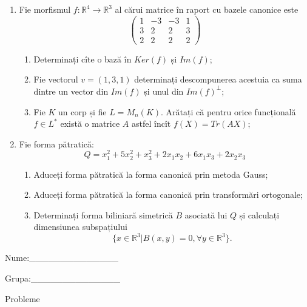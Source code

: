 \documentclass{article}
\begin{document}
\begin{enumerate}
 \item Fie morfismul $f:\mathbb{R}^4 \to \mathbb{R}^3$ al cărui matrice în raport cu bazele canonice este
$$\begin{pmatrix}
1&-3&-3&1\\
3&2&2&3\\
2&2&2&2
\end{pmatrix}$$

\begin{enumerate}
\item Determinați cîte o bază în $Ker(f)$ și $Im(f)$;
\item Fie vectorul $v=(1,3,1)$ determinați descompunerea acestuia ca suma dintre un vector din $Im(f)$ și unul din $Im(f)^\perp$;
\item Fie $K$ un corp și fie $L=M_n(K)$. Arătați că pentru orice funcțională $f \in L^*$ există o matrice $A$ astfel încît $f(X)=Tr(AX)$;
\end{enumerate}
\item Fie forma pătratică:
$$Q= x_1^2+5x_2^2+x_3^2+2x_1x_2+6x_1x_3+2x_2x_3$$

\begin{enumerate}
\item Aduceți forma pătratică la forma canonică prin metoda Gauss;
\item Aduceți forma pătratică la forma canonică prin transformări ortogonale;
\item Determinați forma biliniară simetrică $B$ asociată lui $Q$ și calculați dimensiunea subspațiului
$$\{x \in \mathbb{R}^3 | B(x,y)=0,\forall y \in \mathbb{R}^3\}.$$

\end{enumerate}
\end{enumerate}
\newpage
\begin{flushright}
Nume:\_\_\_\_\_\_\_\_\_\_\_\_\_\_
 
 
Grupa:\_\_\_\_\_\_\_\_\_\_\_\_\_\_
\end{flushright}
\begin{center}
\vspace{2cm}
{\Large Probleme}
\vspace{2cm}
\end{center}
\end{document}
